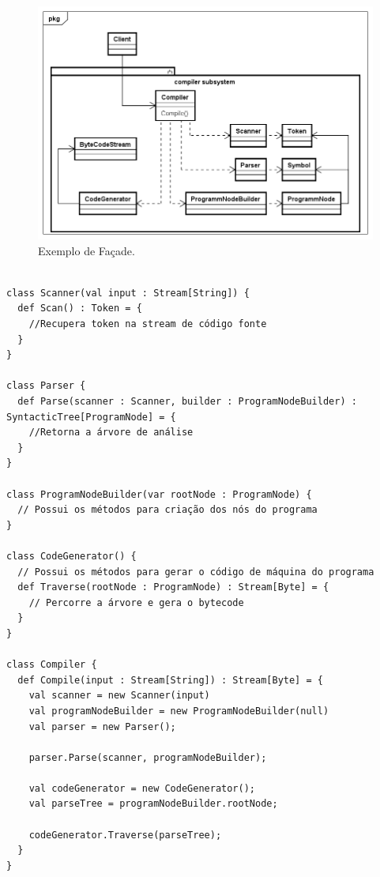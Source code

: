\begin{figure}[htb]
	\caption{\label{facade_exemplo}Exemplo de Façade.}
	\begin{center}
	    \includegraphics[scale=0.4]{5_padroes-contexto-funcional/5.2_estruturais/5.2.5_facade/facade_exemplo.png}
	\end{center}
\end{figure}


\begin{lstlisting}[caption={Façade Orientado a Objetos.},label=oofacade]

class Scanner(val input : Stream[String]) {
  def Scan() : Token = {
    //Recupera token na stream de código fonte
  }
}

class Parser {
  def Parse(scanner : Scanner, builder : ProgramNodeBuilder) : SyntacticTree[ProgramNode] = {
    //Retorna a árvore de análise
  }
}

class ProgramNodeBuilder(var rootNode : ProgramNode) {
  // Possui os métodos para criação dos nós do programa
}

class CodeGenerator() {
  // Possui os métodos para gerar o código de máquina do programa
  def Traverse(rootNode : ProgramNode) : Stream[Byte] = {
    // Percorre a árvore e gera o bytecode
  }
}

class Compiler {
  def Compile(input : Stream[String]) : Stream[Byte] = {
    val scanner = new Scanner(input)
    val programNodeBuilder = new ProgramNodeBuilder(null)
    val parser = new Parser();

    parser.Parse(scanner, programNodeBuilder);

    val codeGenerator = new CodeGenerator();
    val parseTree = programNodeBuilder.rootNode;

    codeGenerator.Traverse(parseTree);
  }
}

\end{lstlisting}

